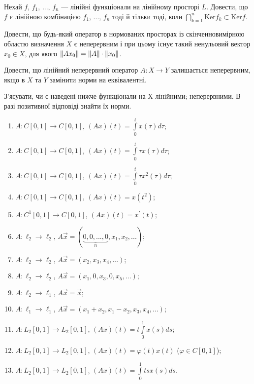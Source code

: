 \begin{exercise}
    Нехай $f$, $f_1$, ..., $f_n$ --- лінійні функціонали на лінійному просторі $L$. 
    Довести, що $f$ є лінійною комбінацією $f_1$, ..., $f_n$ тоді й тільки тоді, 
    коли $\bigcap\limits_{k=1}^n \mathrm{Ker} f_k \subset \mathrm{Ker} f$.
\end{exercise}

\begin{exercise}
    Довести, що будь-який оператор в нормованих просторах із скінченновимірною областю 
    визначення $X$ є неперервним і при цьому існує такий ненульовий вектор $x_0 \in X$, 
    для якого $\left\lVert Ax_0\right\rVert = \left\lVert A\right\rVert\cdot\left\lVert x_0\right\rVert$.
\end{exercise}

\begin{exercise}
    Довести, що лінійний неперервний оператор $A: X \rightarrow Y$ залишається неперервним, 
    якщо в $X$ та $Y$ замінити норми на еквівалентні.
\end{exercise}

\begin{exercise}
    З'ясувати, чи є наведені нижче функціонали на X лінійними; 
    неперервними. В разі позитивної відповіді знайти їх норми.
    \begin{enumerate}[label=\ukr*)]
        \item $A: C[0, 1] \rightarrow C[0, 1]$, $(Ax)(t) = \int\limits_0^t x(\tau) d\tau$;
        \item $A: C[0, 1] \rightarrow C[0, 1]$, $(Ax)(t) = \int\limits_0^t \tau x(\tau) d\tau$;
        \item $A: C[0, 1] \rightarrow C[0, 1]$, $(Ax)(t) = \int\limits_0^t \tau x^2(\tau) d\tau$;
        \item $A: C[0, 1] \rightarrow C[0, 1]$, $(Ax)(t) = x(t^2)$;
        \item $A: C^1[0, 1] \rightarrow C[0, 1]$, $(Ax)(t) = x^\prime (t)$; 
        \item $A: \ell_2 \rightarrow \ell_2$, $A\vec{x} = (\underbrace{0,0,...,0}_n,
        x_1,x_2,...)$;
        \item $A: \ell_2 \rightarrow \ell_2$, $A\vec{x} = (x_2,x_3,x_4,...)$;
        \item $A: \ell_2 \rightarrow \ell_2$, $A\vec{x} = (x_1,0,x_3,0,x_5,...)$;
        \item $A: \ell_2 \rightarrow \ell_1$, $A\vec{x} = \vec{x}$;
        \item $A: \ell_1 \rightarrow \ell_1$, $A\vec{x} = (x_1+x_2, x_1-x_2, x_3, x_4, ...)$;
        \item $A: L_2[0, 1] \rightarrow L_2[0, 1]$, $(Ax)(t) = t \int\limits_0^1 x(s)ds$;
        \item $A: L_2[0, 1] \rightarrow L_2[0, 1]$, $(Ax)(t) = \varphi(t)x(t)$ 
        ($\varphi \in C[0,1]$);
        \item $A: L_2[0, 1] \rightarrow L_2[0, 1]$, $(Ax)(t) = \int\limits_0^1 tsx(s)ds$.
    \end{enumerate}
\end{exercise}